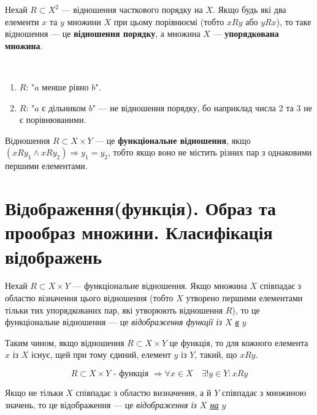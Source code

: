 Нехай $R \subset X^2$ --- відношення часткового порядку на $X$. Якщо будь які два елементи
$x$ та $y$ множини $X$ при цьому порівнюємі (тобто $xRy$ або $yRx$), то таке відношення ---
це \textbf{відношення порядку}, а множина $X$ --- \textbf{упорядкована множина}.

\begin{example}~

    \begin{enumerate}
        \item $R$: "$a$ менше рівно $b$".
        \item $R$: "$a$ є дільником $b$" --- не відношення порядку, бо наприклад числа 2 та 3
            не є порівнюваними.
    \end{enumerate}
\end{example}

Відношення $R \subset X \times Y$ --- це \textbf{функціональне відношення}, якщо 
$(xRy_1 \wedge xRy_2) \Rightarrow y_1 = y_2$, тобто якщо воно не містить різних пар з
однаковими першими елементами.

\begin{center}
     
\end{center}

\section{Відображення(функція). Образ та прообраз множини. Класифікація відображень}

Нехай $R \subset X \times Y$ --- функціональне відношення. Якщо множина $X$
співпадає з областю візначення цього відношення (тобто $X$ утворено першими
елементами тільки тих упорядкованих пар, які утворюють відношення $R$), то це
функціональне відношення --- це \textit{відображення функції із $X$ \underline{\underline{в}} $y$}

Таким чином, якщо відношення $R \subset X \times Y$ це функція, то для кожного
елемента $x$ із $X$ існує, щей при тому єдиний, елемент $y$ із $Y$, такий, що
$xRy$.

\begin{equation*}
    R \subset X \times Y \text{ - функція } \Rightarrow \forall x \in X \quad \exists! y \in Y: xRy
\end{equation*}

Якщо не тільки $X$ співпадає з областю визначення, а й $Y$ співпадає з множиною
значень, то це відображення --- це \textit{відображення із $X$
\underline{\underline{на}} $y$}

